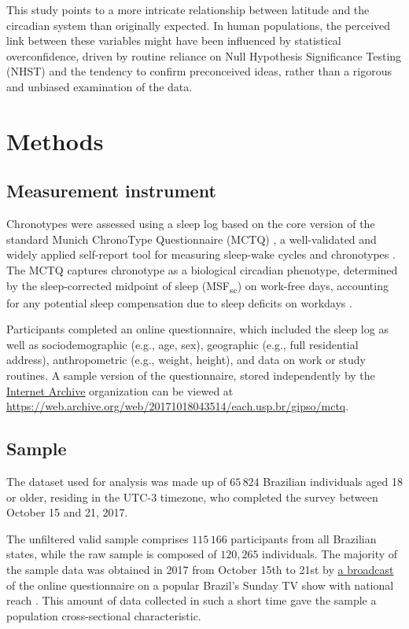 \documentclass[
12pt,
openright,
oneside,
a4paper,
chapter=TITLE,
section=TITLE,
french,
spanish,
brazil,
english
]{abntex2}
\begin{document}
This study points to a more intricate relationship between latitude and
the circadian system than originally expected. In human populations, the
perceived link between these variables might have been influenced by
statistical overconfidence, driven by routine reliance on Null
Hypothesis Significance Testing (NHST) and the tendency to confirm
preconceived ideas, rather than a rigorous and unbiased examination of
the data.

\section{Methods}\label{methods}

\subsection{Measurement instrument}\label{measurement-instrument}

Chronotypes were assessed using a sleep log based on the core version of
the standard Munich ChronoType Questionnaire (MCTQ)
\autocite{roenneberg2003}, a well-validated and widely applied
self-report tool for measuring sleep-wake cycles and chronotypes
\autocite{roenneberg2019}. The MCTQ captures chronotype as a biological
circadian phenotype, determined by the sleep-corrected midpoint of sleep
(MSF\textsubscript{sc}) on work-free days, accounting for any potential
sleep compensation due to sleep deficits on workdays
\autocite{roenneberg2012}.

Participants completed an online questionnaire, which included the sleep
log as well as sociodemographic (e.g., age, sex), geographic (e.g., full
residential address), anthropometric (e.g., weight, height), and data on
work or study routines. A sample version of the questionnaire, stored
independently by the \href{https://archive.org/}{Internet Archive}
organization can be viewed at
\url{https://web.archive.org/web/20171018043514/each.usp.br/gipso/mctq}.

\subsection{Sample}\label{sample}

The dataset used for analysis was made up of \(65\,824\) Brazilian
individuals aged 18 or older, residing in the UTC-3 timezone, who
completed the survey between October 15 and 21, 2017.

The unfiltered valid sample comprises \(115\,166\) participants from all
Brazilian states, while the raw sample is composed of \(120,265\)
individuals. The majority of the sample data was obtained in 2017 from
October 15th to 21st by \href{https://globoplay.globo.com/v/6219513/}{a
broadcast} of the online questionnaire on a popular Brazil's Sunday TV
show with national reach \autocite{redeglobo2017}. This amount of data
collected in such a short time gave the sample a population
cross-sectional characteristic.
\end{document}
